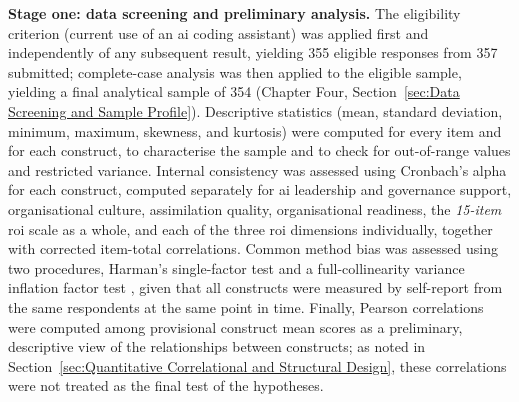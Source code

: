 \textbf{Stage one: data screening and preliminary analysis.} The eligibility criterion (current use of an \gls{ai} coding assistant) was applied first and independently of any subsequent result, yielding 355 eligible responses from 357 submitted; complete-case analysis was then applied to the eligible sample, yielding a final analytical sample of 354 (Chapter Four, Section~\ref{sec:Data Screening and Sample Profile}). Descriptive statistics (mean, standard deviation, minimum, maximum, skewness, and kurtosis) were computed for every item and for each construct, to characterise the sample and to check for out-of-range values and restricted variance. Internal consistency was assessed using Cronbach's alpha for each construct, computed separately for \gls{ai} leadership and governance support, organisational culture, assimilation quality, organisational readiness, the \textit{15-item} \gls{roi} scale as a whole, and each of the three \gls{roi} dimensions individually, together with corrected item-total correlations. Common method bias was assessed using two procedures, Harman's single-factor test and a full-collinearity variance inflation factor test \autocite{Kock2015}, given that all constructs were measured by self-report from the same respondents at the same point in time. Finally, Pearson correlations were computed among provisional construct mean scores as a preliminary, descriptive view of the relationships between constructs; as noted in Section~\ref{sec:Quantitative Correlational and Structural Design}, these correlations were not treated as the final test of the hypotheses.

